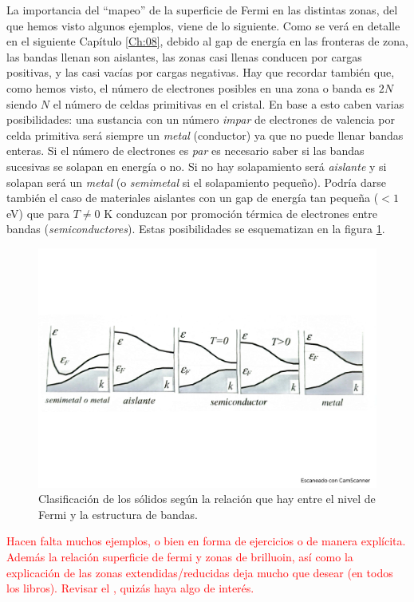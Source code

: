 La importancia del ``mapeo'' de la superficie de Fermi en las distintas zonas, del que hemos visto algunos ejemplos, viene de lo siguiente. Como se verá en detalle en el siguiente Capítulo \ref{Ch:08}, debido al gap de energía en las fronteras de zona, las bandas llenan son aislantes, las zonas casi llenas conducen por cargas positivas, y las casi vacías por cargas negativas. Hay que recordar también que, como hemos visto, el número de electrones posibles en una zona o banda es $2N$ siendo $N$ el número de celdas primitivas en el cristal. En base a esto caben varias posibilidades: una sustancia con un número \textit{impar} de electrones de valencia por celda primitiva será siempre un \textit{metal} (conductor) ya que no puede llenar bandas enteras. Si el número de electrones es \textit{par} es necesario saber si las bandas sucesivas se solapan en energía o no. Si no hay solapamiento será \textit{aislante} y si solapan será un \textit{metal} (o \textit{semimetal} si el solapamiento pequeño). Podría darse también el caso de materiales aislantes con un gap de energía tan pequeña ($<1$ eV) que para $T\neq 0$ K conduzcan por promoción térmica de electrones entre bandas (\textit{semiconductores}). Estas posibilidades se esquematizan en la figura \ref{Fig:07-10}.

\begin{figure}[h!] \centering
	\includegraphics[scale=0.5]{Cuerpo/Ch_07/Fotos libro 10.pdf}
	\caption{Clasificación de los sólidos según la relación que hay entre el nivel de Fermi y la estructura de bandas.}
	\label{Fig:07-10}
\end{figure}    


\begin{Anotacion}
	\textcolor{red}{Hacen falta muchos ejemplos, o bien en forma de ejercicios o de manera explícita. Además la relación superficie de fermi y zonas de brilluoin, así como la explicación de las zonas extendidas/reducidas deja mucho que desear (en todos los libros). Revisar el \cite{Quiin}, quizás haya algo de interés.}
\end{Anotacion}



